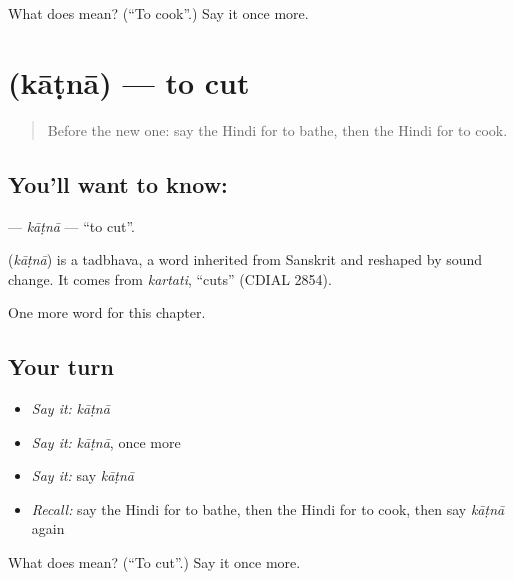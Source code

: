 \begin{tcolorbox}[breakable,colback=teal!4,colframe=teal!35!black,title={Before you move on}]
What does  mean? (\textquotedblleft{}To cook\textquotedblright{}.) Say it once more.
\end{tcolorbox}
\section[\texorpdfstring{\hi{काटना} (kāṭnā)}{काटना (kāṭnā)}]{ (kāṭnā) — to cut}

\label{lesson:HI-C161-katna}



\begin{quote}
Before the new one: say the Hindi for to bathe, then the Hindi for to cook.
\end{quote}

\subsection*{You'll want to know: }
\textbf{} — \emph{kāṭnā} — \textquotedblleft{}to cut\textquotedblright{}.

\begin{cousinweb}
\textbf{} (\emph{kāṭnā}) is a tadbhava, a word inherited from Sanskrit and reshaped by sound change. It comes from \emph{kartati}, \textquotedblleft{}cuts\textquotedblright{} (CDIAL 2854).
\end{cousinweb}

\begin{grammarlens}[title={What you've built}]
One more word for this chapter.
\end{grammarlens}

\subsection*{Your turn}
\begin{itemize}
\raggedright
  \item \emph{Say it:} \emph{kāṭnā}
  \item \emph{Say it:} \emph{kāṭnā}, once more
  \item \emph{Say it:} say \emph{kāṭnā}
  \item \emph{Recall:} say the Hindi for to bathe, then the Hindi for to cook, then say \emph{kāṭnā} again
\end{itemize}

\begin{tcolorbox}[breakable,colback=teal!4,colframe=teal!35!black,title={Before you move on}]
What does  mean? (\textquotedblleft{}To cut\textquotedblright{}.) Say it once more.
\end{tcolorbox}
